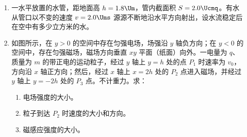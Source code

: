\documentclass[\gkver]{gaokaozhenti}
\begin{document}
\begin{enumerate}
{	（3）在图（a）中 $\frac{U_{1}}{r_{1}}+\frac{U_{1}}{R_{x}}=\frac{U_{2}}{r_{2}}$，在图（b）中 $U_{2}=U_{1}+R_{x}\times\frac{U_{1}}{r_{1}}$，化简得 $R_{x}=\frac{r_{1}r_{2}U_{1}}{r_{1}U_{2}-r_{2}U_{1}}$ 或 $R_{x}=\frac{(U_{2}-U_{1})r_{1}}{U_{1}}$。
}

\item
一水平放置的水管，距地面高 $h=1.8\Um$，管内截面积 $S=2.0\Ucmq$。有水从管口以不变的速度 $v=2.0\Ums$ 源源不断地沿水平方向射出，设水流稳定后在空中有多少立方米的水。

\item
如图所示，在 $y>0$ 的空间中存在匀强电场，场强沿 $y$ 轴负方向；在 $y<0$ 的空间中，存在匀强磁场，磁场方向垂直 $xy$ 平面（纸面）向外。一电量为 $q$、质量为 $m$ 的带正电的运动粒子，经过 $y$ 轴上 $y=h$ 处的点 $P_{1}$ 时速率为 $v_{0}$，方向沿 $x$ 轴正方向；然后，经过 $x$ 轴上 $x=2h$ 处的 $P_{2}$ 点进入磁场，并经过 $y$ 轴上 $y=-2h$ 处的 $P_{3}$ 点。不计重力。求：
\begin{enumerate}
	\item
	电场强度的大小。
	\item
	粒子到达 $P_{2}$ 时速度的大小和方向。
	\item
	磁感应强度的大小。
\end{enumerate}
\end{enumerate}
\end{document}
